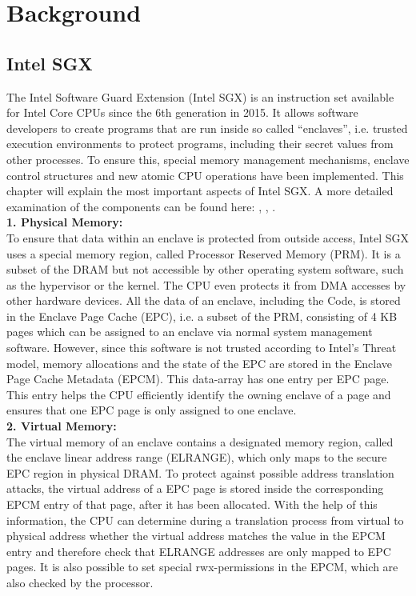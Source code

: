 
\chapter{Background}\label{chapter:background}

\section{Intel SGX}
The Intel Software Guard Extension (Intel SGX) is an instruction set available for Intel Core CPUs since the 6th generation in 2015. 
It allows software developers to create programs that are run inside so called “enclaves”, i.e. trusted execution environments to protect programs, including their secret values from other processes. To ensure this, special memory management mechanisms, enclave control structures and new atomic CPU operations have been implemented. 
This chapter will explain the most important aspects of Intel SGX. A more detailed examination of the components can be found here: \cite{sgx_explained}, \cite{sgx_101}, \cite{sgx_developer_guide}.\\

\textbf{1. Physical Memory:}\\
To ensure that data within an enclave is protected from outside access, Intel SGX uses a special memory region, called Processor Reserved Memory (PRM). It is a subset of the DRAM but not accessible by other operating system software, such as the hypervisor or the kernel. The CPU even protects it from DMA accesses by other hardware devices.
All the data of an enclave, including the Code, is stored in the Enclave Page Cache (EPC), i.e. a subset of the PRM, consisting of 4 KB pages which can be assigned to an enclave via normal system management software. However, since this software is not trusted according to Intel's Threat model, memory allocations and the state of the EPC are stored in the Enclave Page Cache Metadata (EPCM). This data-array has one entry per EPC page. This entry helps the CPU efficiently identify the owning enclave of a page and ensures that one EPC page is only assigned to one enclave.\\

\textbf{2. Virtual Memory:}\\
The virtual memory of an enclave contains a designated memory region, called the enclave linear address range (ELRANGE), which only maps to the secure EPC region in physical DRAM. \cite{sgx_101} To protect against possible address translation attacks, the virtual address of a EPC page is stored inside the corresponding EPCM entry of that page, after it has been allocated. With the help of this information, the CPU can determine during a translation process from virtual to physical address whether the virtual address matches the value in the EPCM entry and therefore check that ELRANGE addresses are only mapped to EPC pages. It is also possible to set special rwx-permissions in the EPCM, which are also checked by the processor. \\

